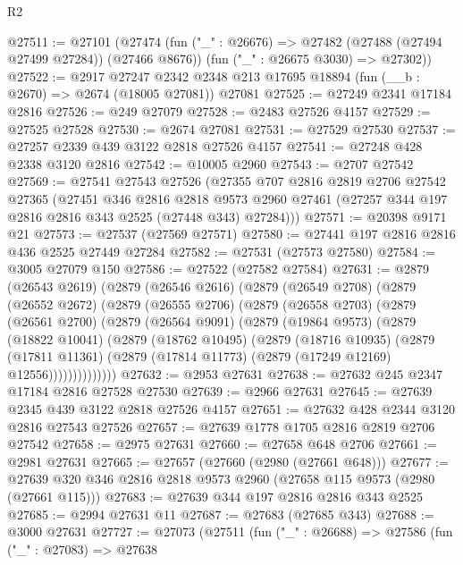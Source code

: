 \begin{lexlean}{R2}
\begin{coremodule}
@27511 := @27101
    (@27474
      (fun ("_" : @26676) => @27482 (@27488 (@27494 @27499 @27284)) (@27466 @8676))
      (fun ("_" : @26675 @3030) => @27302))
@27522 := @2917
    @27247
    @2342
    @2348
    @213
    @17695
    @18894
    (fun (__b : @2670) => @2674 (@18005 @27081))
    @27081
@27525 := @27249 @2341 @17184 @2816
@27526 := @249 @27079
@27528 := @2483 @27526 @4157
@27529 := @27525 @27528
@27530 := @2674 @27081
@27531 := @27529 @27530
@27537 := @27257 @2339 @439 @3122 @2818 @27526 @4157
@27541 := @27248 @428 @2338 @3120 @2816
@27542 := @10005 @2960
@27543 := @2707 @27542
@27569 := @27541
    @27543
    @27526
    (@27355
      @707
      @2816
      @2819
      @2706
      @27542
      @27365
      (@27451
        @346
        @2816
        @2818
        @9573
        @2960
        @27461
        (@27257 @344 @197 @2816 @2816 @343 @2525 (@27448 @343) @27284)))
@27571 := @20398 @9171 @21
@27573 := @27537 (@27569 @27571)
@27580 := @27441 @197 @2816 @2816 @436 @2525 @27449 @27284
@27582 := @27531 (@27573 @27580)
@27584 := @3005 @27079 @150
@27586 := @27522 (@27582 @27584)
@27631 := @2879
    (@26543 @2619)
    (@2879
      (@26546 @2616)
      (@2879
        (@26549 @2708)
        (@2879
          (@26552 @2672)
          (@2879
            (@26555 @2706)
            (@2879
              (@26558 @2703)
              (@2879
                (@26561 @2700)
                (@2879
                  (@26564 @9091)
                  (@2879
                    (@19864 @9573)
                    (@2879
                      (@18822 @10041)
                      (@2879
                        (@18762 @10495)
                        (@2879
                          (@18716 @10935)
                          (@2879
                            (@17811 @11361)
                            (@2879 (@17814 @11773) (@2879 (@17249 @12169) @12556))))))))))))))
@27632 := @2953 @27631
@27638 := @27632 @245 @2347 @17184 @2816 @27528 @27530
@27639 := @2966 @27631
@27645 := @27639 @2345 @439 @3122 @2818 @27526 @4157
@27651 := @27632 @428 @2344 @3120 @2816 @27543 @27526
@27657 := @27639 @1778 @1705 @2816 @2819 @2706 @27542
@27658 := @2975 @27631
@27660 := @27658 @648 @2706
@27661 := @2981 @27631
@27665 := @27657 (@27660 (@2980 (@27661 @648)))
@27677 := @27639 @320 @346 @2816 @2818 @9573 @2960 (@27658 @115 @9573 (@2980 (@27661 @115)))
@27683 := @27639 @344 @197 @2816 @2816 @343 @2525
@27685 := @2994 @27631 @11
@27687 := @27683 (@27685 @343)
@27688 := @3000 @27631
@27727 := @27073
    (@27511
      (fun ("_" : @26688) =>
      @27586
        (fun ("_" : @27083) =>
        @27638

\end{coremodule}
\end{lexlean}
